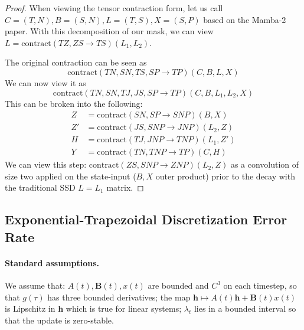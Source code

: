 \documentclass{article}
\def\vh{{\bm{h}}}
\def\bB{{\bm{B}}}
\theoremstyle{plain}
\theoremstyle{definition}
\theoremstyle{remark}
\begin{document}
\begin{proof}
    When viewing the tensor contraction form, let us call $C = (T,N), B=(S,N), L=(T,S), X=(S,P)$ based on the Mamba-2 paper. With this decomposition of our mask, we can view $L = \text{contract}(TZ,ZS\rightarrow TS)(L_1,L_2)$.
    
    The original contraction can be seen as
    $$\text{contract}(TN,SN,TS,SP\rightarrow TP)(C,B,L,X)$$
    We can now view it as
    $$\text{contract}(TN,SN,TJ,JS,SP\rightarrow TP)(C,B,L_1,L_2,X)$$
    This can be broken into the following:
    \begin{align*}
        Z &= \text{contract}(SN,SP\rightarrow SNP)(B,X)\\
        Z' &= \text{contract}(JS,SNP\rightarrow JNP)(L_2,Z)\\
        H &= \text{contract}(TJ,JNP\rightarrow TNP)(L_1,Z') \\
        Y &= \text{contract}(TN,TNP\rightarrow TP)(C,H)
    \end{align*}
    We can view this step: $\text{contract}(ZS,SNP\rightarrow ZNP)(L_2,Z)$ as a convolution of size two applied on the state-input ($B,X$ outer product) prior to the decay with the traditional SSD $L=L_1$ matrix.
\end{proof}
    
\subsection{Exponential-Trapezoidal Discretization Error Rate}
\label{app:trap-error-proof}
\paragraph{Standard assumptions.}
We assume that: $A(t),\bB(t),x(t)$ are bounded and $C^3$ on each timestep, so that $g(\tau)$ has three bounded derivatives; the map $\vh \mapsto A(t)\vh + \bB(t)x(t)$ is Lipschitz in $\vh$ which is true for linear systems; $\lambda_t$ lies in a bounded interval so that the update is zero-stable.
\end{document}
